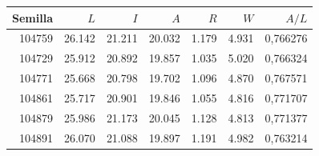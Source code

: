 \begin{tabular}{rrrrrrr}\hline
Semilla & $L$ & $I$ & $A$ & $R$ & $W$ & $A/L$ \\\hline
104759 & 26.142 & 21.211 & 20.032 & 1.179 & 4.931 & 0,766276 \\
104729 & 25.912 & 20.892 & 19.857 & 1.035 & 5.020 & 0,766324 \\
104771 & 25.668 & 20.798 & 19.702 & 1.096 & 4.870 & 0,767571 \\
104861 & 25.717 & 20.901 & 19.846 & 1.055 & 4.816 & 0,771707 \\
104879 & 25.986 & 21.173 & 20.045 & 1.128 & 4.813 & 0,771377 \\
104891 & 26.070 & 21.088 & 19.897 & 1.191 & 4.982 & 0,763214 \\
\hline\end{tabular}

